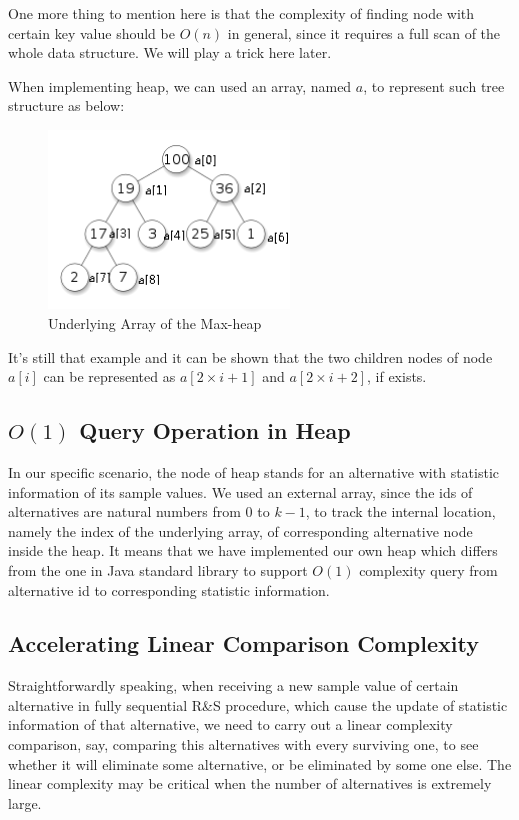 One more thing to mention here is that the complexity of finding node with certain key value should be $O(n)$ in general, since it requires a full scan of the whole data structure. We will play a trick here later.

When implementing heap, we can used an array, named $a$, to represent such tree structure as below:

\begin{figure}[ht]
\centering
\includegraphics[width=64mm]{heap2.png}
\caption{Underlying Array of the Max-heap}
\end{figure}

It's still that example and it can be shown that the two children nodes of node $a[i]$ can be represented as $a[2 \times i + 1]$ and $a[2 \times i + 2]$, if exists.

\subsection{$O(1)$ Query Operation in Heap}

In our specific scenario, the node of heap stands for an alternative with statistic information of its sample values. We used an external array, since the ids of alternatives are natural numbers from $0$ to $k - 1$, to track the internal location, namely the index of the underlying array, of corresponding alternative node inside the heap. It means that we have implemented our own heap which differs from the one in Java standard library to support $O(1)$ complexity query from alternative id to corresponding statistic information.

\subsection{Accelerating Linear Comparison Complexity}

Straightforwardly speaking, when receiving a new sample value of certain alternative in fully sequential R\&S procedure, which cause the update of statistic information of that alternative, we need to carry out a linear complexity comparison, say, comparing this alternatives with every surviving one, to see whether it will eliminate some alternative, or be eliminated by some one else. The linear complexity may be critical when the number of alternatives is extremely large.

